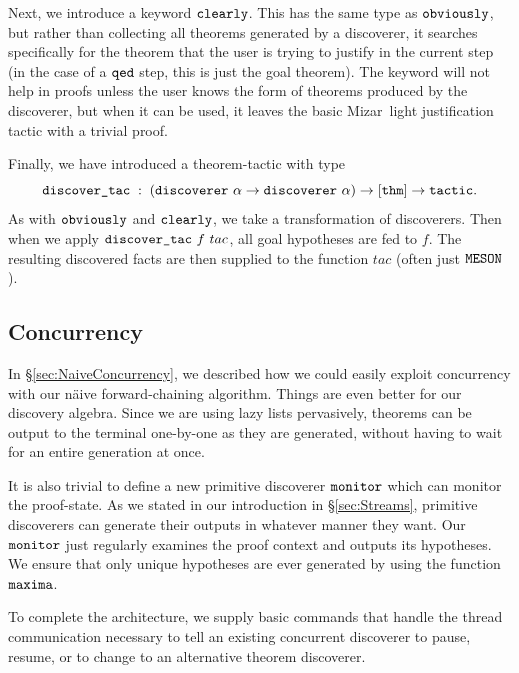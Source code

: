 Next, we introduce a keyword $\texttt{clearly}$. This has the same type as $\texttt{obviously}$, but rather than collecting all theorems generated by a discoverer, it searches specifically for the theorem that the user is trying to justify in the current step (in the case of a $\texttt{qed}$ step, this is just the goal theorem). The keyword will not help in proofs unless the user knows the form of theorems produced by the discoverer, but when it can be used, it leaves the basic Mizar~light justification tactic with a trivial proof.

\label{sec:DiscoverTac}
Finally, we have introduced a theorem-tactic  with type
\begin{displaymath}
\code{discover\_tac}\;:\;(\code{discoverer}\ \alpha\rightarrow\code{discoverer}\ \alpha) \rightarrow [\code{thm}] \rightarrow \code{tactic}.
\end{displaymath}
As with $\texttt{obviously}$ and $\texttt{clearly}$, we take a transformation of discoverers. Then when we apply $\texttt{discover\_tac}\ f\ tac$,  all goal hypotheses are fed to $f$. The resulting discovered facts are then supplied to the function $tac$ (often just $\texttt{MESON}$).

\subsection{Concurrency}
In \S\ref{sec:NaiveConcurrency}, we described how we could easily exploit concurrency with our n\"{a}ive forward-chaining algorithm. Things are even better for our discovery algebra. Since we are using lazy lists pervasively, theorems can be output to the terminal one-by-one as they are generated, without having to wait for an entire generation at once.

It is also trivial to define a new primitive discoverer $\texttt{monitor}$ which can monitor the proof-state. As we stated in our introduction in \S\ref{sec:Streams}, primitive discoverers can generate their outputs in whatever manner they want. Our $\texttt{monitor}$ just regularly examines the proof context and outputs its hypotheses. We ensure that only unique hypotheses are ever generated by using the function $\texttt{maxima}$.

To complete the architecture, we supply basic commands that handle the thread communication necessary to tell an existing concurrent discoverer to pause, resume, or to change to an alternative theorem discoverer.


